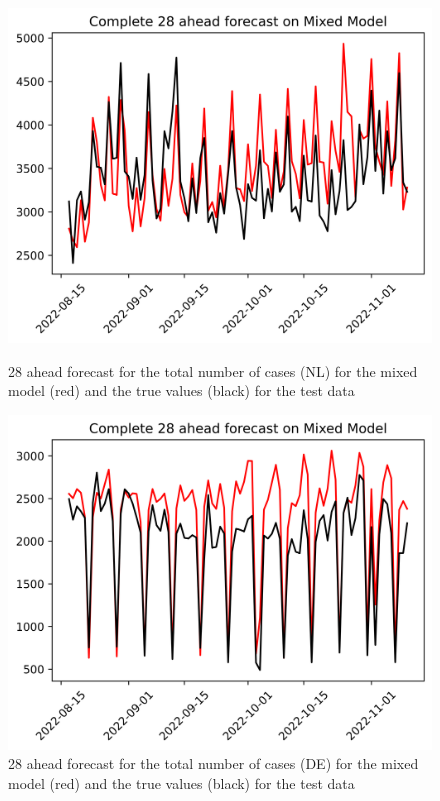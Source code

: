 \begin{figure}

\begin{minipage}{.45\textwidth}
  \centering
  \includegraphics[width=\linewidth]{pics/28_ah/Complete_28_ahead_Mixed Model.png}
  \caption{28 ahead forecast for the total number of cases (NL) for the mixed model (red) and the true values (black) for the test data}
  \label{fig:tot_cases_fc_28_mix}
\end{minipage}
\begin{minipage}{.45\textwidth}
  \centering
  \includegraphics[width=\linewidth]{pics/28_ah/DE_Complete_28_ahead_Mixed Model.png}
  \caption{28 ahead forecast for the total number of cases (DE) for the mixed model (red) and the true values (black) for the test data}
  \label{fig:tot_cases_fc_28_mix_DE}
\end{minipage}

\end{figure}

